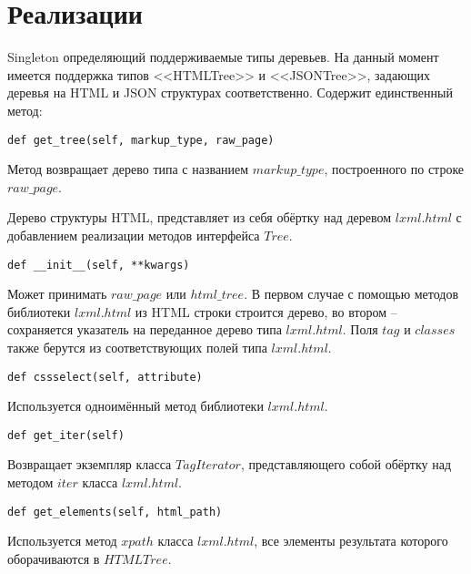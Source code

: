 \chapter{Реализации}



Singleton определяющий поддерживаемые типы деревьев. На данный момент имеется поддержка типов <<HTMLTree>> и <<JSONTree>>, задающих деревья на HTML и JSON структурах соответственно. Содержит единственный метод:
\\

\begin{lstlisting}
def get_tree(self, markup_type, raw_page)
\end{lstlisting}
Метод возвращает дерево типа с названием $markup\_type$, построенного по строке $raw\_page$.
\\


Дерево структуры HTML, представляет из себя обёртку над деревом $lxml.html$ с добавлением реализации методов интерфейса $Tree$.
\\

\begin{lstlisting}
def __init__(self, **kwargs)
\end{lstlisting}
Может принимать $raw\_page$ или $html\_tree$. В первом случае с помощью методов библиотеки $lxml.html$ из HTML строки строится дерево, во втором -- сохраняется указатель на переданное дерево типа $lxml.html$. Поля $tag$ и $classes$ также берутся из соответствующих полей типа $lxml.html$.
\\

\begin{lstlisting}
def cssselect(self, attribute)
\end{lstlisting}
Используется одноимённый метод библиотеки $lxml.html$.
\\

\begin{lstlisting}
def get_iter(self)
\end{lstlisting}
Возвращает экземпляр класса $TagIterator$, представляющего собой обёртку над методом $iter$ класса $lxml.html$.
\\

\begin{lstlisting}
def get_elements(self, html_path)
\end{lstlisting}
Используется метод $xpath$ класса $lxml.html$, все элементы результата которого оборачиваются в $HTMLTree$.
\\

